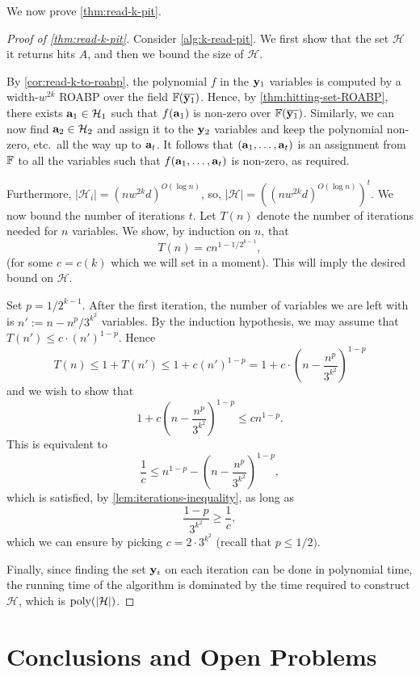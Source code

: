 \documentclass[11pt]{article}
\newcommand{\cH}{\mathcal{H}}
\begin{document}
We now prove \autoref{thm:read-k-pit}.

\begin{proof}[Proof of \autoref{thm:read-k-pit}]
Consider \autoref{alg:k-read-pit}. We first show that the set $\cH$ it returns hits $A$, and then we bound the size of $\cH$.

By \autoref{cor:read-k-to-roabp}, the polynomial $f$ in the $\mathbf{y}_1$ variables is computed by a width-$w^{2k}$ ROABP over the field $\F(\overline{\vecy_1})$. Hence, by \autoref{thm:hitting-set-ROABP}, there exists $\veca_1 \in \cH_1$ such that $f(\mathbf{a}_1)$ is non-zero over $\F(\overline{\vecy_1})$. Similarly, we can now find $\veca_2 \in \cH_2$ and assign it to the $\mathbf{y}_2$ variables and keep the polynomial non-zero, etc.\ all the way up to $\mathbf{a}_t$. It follows that $(\mathbf{a}_1, \ldots, \mathbf{a}_t)$ is an assignment from $\F$ to all the variables such that $f(\mathbf{a}_1, \ldots, \mathbf{a}_t)$ is non-zero, as required.

Furthermore, $|\cH_i| = (nw^{2k}d)^{O(\log n)}$, so, $|\cH| = ((nw^{2k}d)^{O(\log n)})^t$. We now bound the number of iterations $t$. Let $T(n)$ denote the number of iterations needed for $n$ variables. We show, by induction on $n$, that
\[
T(n) = c n^{1-1/2^{k-1}},
\]
(for some $c=c(k)$ which we will set in a moment). This will imply the desired bound on $\cH$.

Set $p = 1/2^{k-1}$. After the first iteration, the number of variables we are left with is $n':=n-n^{p}/3^{k^2}$ variables. By the induction hypothesis, we may assume that $T(n') \le c \cdot (n')^{1-p}$. Hence
\[
T(n) \le 1+T(n') \le 1+ c (n')^{1-p} = 1 + c \cdot \left( n - \frac{n^p}{3^{k^2}} \right) ^ {1-p}
\]
and we wish to show that
\[
1 + c \left( n - \frac{n^p}{3^{k^2}} \right) ^ {1-p} \le  c n^{1-p}.
\]
This is equivalent to
\[
\frac{1}{c} \le n^{1-p} - \left( n - \frac{n^p}{3^{k^2}} \right) ^ {1-p},
\]
which is satisfied, by \autoref{lem:iterations-inequality}, as long as
\[
\frac{1-p}{3^{k^2}} \ge \frac{1}{c},
\]
which we can ensure by picking $c=2\cdot 3^{k^2}$ (recall that $p \le 1/2)$.

Finally, since finding the set $\mathbf{y}_i$ on each iteration can be done in polynomial time, the running time of the algorithm is dominated by the time required to construct $\cH$, which is $\poly(|\cH|)$.
\end{proof}


\section{Conclusions and Open Problems}\label{sec:conclusions}
\end{document}
